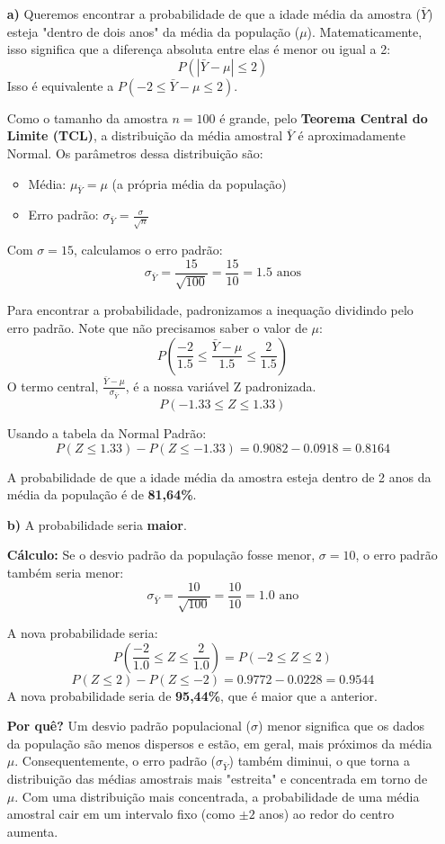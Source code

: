 \documentclass[12pt, a4paper]{article}
\begin{document}
\begin{itemize}
    \item[\textbf{a)}] Queremos encontrar a probabilidade de que a idade média da amostra ($\bar{Y}$) esteja "dentro de dois anos" da média da população ($\mu$). Matematicamente, isso significa que a diferença absoluta entre elas é menor ou igual a 2:
    $$ P(|\bar{Y} - \mu| \le 2) $$
    Isso é equivalente a $P(-2 \le \bar{Y} - \mu \le 2)$.

    Como o tamanho da amostra $n=100$ é grande, pelo \textbf{Teorema Central do Limite (TCL)}, a distribuição da média amostral $\bar{Y}$ é aproximadamente Normal. Os parâmetros dessa distribuição são:
    \begin{itemize}
        \item Média: $\mu_{\bar{Y}} = \mu$ (a própria média da população)
        \item Erro padrão: $\sigma_{\bar{Y}} = \frac{\sigma}{\sqrt{n}}$
    \end{itemize}
    
    Com $\sigma=15$, calculamos o erro padrão:
    $$ \sigma_{\bar{Y}} = \frac{15}{\sqrt{100}} = \frac{15}{10} = 1.5 \text{ anos} $$
    
    Para encontrar a probabilidade, padronizamos a inequação dividindo pelo erro padrão. Note que não precisamos saber o valor de $\mu$:
    $$ P\left( \frac{-2}{1.5} \le \frac{\bar{Y} - \mu}{1.5} \le \frac{2}{1.5} \right) $$
    O termo central, $\frac{\bar{Y} - \mu}{\sigma_{\bar{Y}}}$, é a nossa variável Z padronizada.
    $$ P(-1.33 \le Z \le 1.33) $$
    
    Usando a tabela da Normal Padrão:
    $$ P(Z \le 1.33) - P(Z \le -1.33) = 0.9082 - 0.0918 = 0.8164 $$
    
    A probabilidade de que a idade média da amostra esteja dentro de 2 anos da média da população é de \textbf{81,64\%}.

    \item[\textbf{b)}] A probabilidade seria \textbf{maior}.
    
    \textbf{Cálculo:} Se o desvio padrão da população fosse menor, $\sigma=10$, o erro padrão também seria menor:
    $$ \sigma_{\bar{Y}} = \frac{10}{\sqrt{100}} = \frac{10}{10} = 1.0 \text{ ano} $$
    
    A nova probabilidade seria:
    $$ P\left( \frac{-2}{1.0} \le Z \le \frac{2}{1.0} \right) = P(-2 \le Z \le 2) $$
    $$ P(Z \le 2) - P(Z \le -2) = 0.9772 - 0.0228 = 0.9544 $$
    A nova probabilidade seria de \textbf{95,44\%}, que é maior que a anterior.

    \textbf{Por quê?} Um desvio padrão populacional ($\sigma$) menor significa que os dados da população são menos dispersos e estão, em geral, mais próximos da média $\mu$. Consequentemente, o erro padrão ($\sigma_{\bar{Y}}$) também diminui, o que torna a distribuição das médias amostrais mais "estreita" e concentrada em torno de $\mu$. Com uma distribuição mais concentrada, a probabilidade de uma média amostral cair em um intervalo fixo (como $\pm 2$ anos) ao redor do centro aumenta.
    
\end{itemize}
\end{document}
